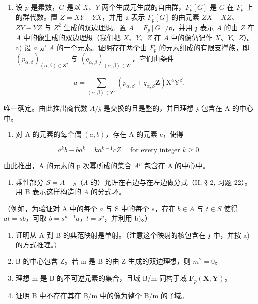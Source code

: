 
\begin{enumerate}
\def\labelenumi{\arabic{enumi})}
\tightlist
\item
  设 \(p\) 是素数，\(G\) 是以 \(X\)、\(Y\) 两个生成元生成的自由群，\(F_p[G]\) 是 \(G\) 在 \(F_p\) 上的群代数。置 \(Z = XY - YX\)，并用 \(\mathfrak{a}\) 表示 \(F_p[G]\) 的由元素 \(ZX - XZ\)、\(ZY - YZ\) 与 \(Z^2\) 生成的双边理想。置 \(A = F_p[G]/\mathfrak{a}\)，并用 \(\mathfrak{z}\) 表示 \(A\) 的由 \(Z\) 在 \(A\) 中的像生成的双边理想（我们把 \(X\)、\(Y\)、\(Z\) 在 \(A\) 中的像仍记作 \(X\)、\(Y\)、\(Z\)）。a) 设 \(a\) 是 \(A\) 的一个元素。证明存在两个由 \(F_p\) 的元素组成的有限支撑族，即 \((p_{\alpha,\beta})_{(\alpha,\beta)\in\mathbf{Z}^2}\) 与 \((q_{\alpha,\beta})_{(\alpha,\beta)\in\mathbf{Z}^2}\)，它们由条件
\end{enumerate}

\[
a = \sum_ {(\alpha , \beta) \in \mathbf {Z} ^ {2}} (p _ {\alpha , \beta} + q _ {\alpha , \beta} \mathbf {Z}) \mathrm{X} ^ {\alpha} \mathrm{Y} ^ {\beta}.
\]

唯一确定。由此推出商代数 \(A/\mathfrak{z}\) 是交换的且是整的，并且理想 \(\mathfrak{z}\) 包含在 A 的中心中。

\begin{enumerate}
\def\labelenumi{\alph{enumi})}
\setcounter{enumi}{1}
\tightlist
\item
  对 A 的元素的每个偶 \((a, b)\)，存在 A 的元素 c，使得
\end{enumerate}

\[
  a ^ {k} b - b a ^ {k} = k a ^ {k - 1} c Z \quad \text { for every integer } k \geqslant 0.
\]

由此推出，A 的元素的 p 次幂所成的集合 \(A^{p}\) 包含在 A 的中心中。

\begin{enumerate}
\def\labelenumi{\alph{enumi})}
\setcounter{enumi}{2}
\tightlist
\item
  乘性部分 \(S = A - \mathfrak{z}\)（\(A\) 的）允许在右边与在左边做分式（II, § 2, 习题 22）。用 B 表示这样构造的 \(A\) 的分式环。
\end{enumerate}

（例如，为验证对 A 中的每个 \(a\) 与 S 中的每个 \(s\)，存在 \(b \in A\) 与 \(t \in S\) 使得 \(at = sb\)，可取 \(b = s^{p-1}a\)，\(t = s^p\)，并利用 b)。）

\begin{enumerate}
\def\labelenumi{\alph{enumi})}
\setcounter{enumi}{3}
\item
  证明从 A 到 B 的典范映射是单射。（注意这个映射的核包含在 \(\mathfrak{z}\) 中，并按 a) 的方式推理。）
\item
  B 的中心包含 Z。若 m 是 B 的由 Z 生成的双边理想，则 \(m^{2} = 0\)。
\item
  理想 m 是 B 的不可逆元素的集合，且域 B/m 同构于域 \(\mathbf{F}_{p}(\mathbf{X}, \mathbf{Y})\)。
\item
  证明 B 中不存在其在 B/m 中的像为整个 B/m 的子域。
\end{enumerate}

